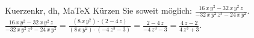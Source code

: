 \begin{MAufgabe}{Kuerzen}{kr, dh, MaTeX}
K\"urzen Sie soweit m\"oglich: $\frac{16\, x\, y^2 - 32\, x\, y^2\, z}{ - 32\, x\, y^2\, z^3 - 24\, x\, y^2}$.\\ 
\ifLsg\MLoesung
\quad $\frac{16\, x\, y^2 - 32\, x\, y^2\, z}{ - 32\, x\, y^2\, z^3 - 24\, x\, y^2}=\frac{(8\, x\, y^2)\cdot(2 - 4\, z)}{(8\, x\, y^2)\cdot( - 4\, z^3 - 3)}=\frac{2 - 4\, z}{ - 4\, z^3 - 3}=\frac{4\, z - 2}{4\, z^3 + 3}$.\else\relax\fi
 \end{MAufgabe}